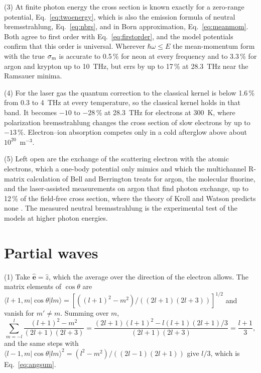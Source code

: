 \documentclass[11pt]{article}
\numberwithin{equation}{section}
\newcommand{\ehat}{\hat{\mathbf e}}
\newcommand{\sm}{\sigma_{\rm m}}
\begin{document}
{\noindent}(3) At finite photon energy the cross section is known exactly for
a zero-range potential, Eq.~\eqref{eq:twoenergy}, which is also the emission
formula of neutral bremsstrahlung, Eq.~\eqref{eq:nbrs}, and in Born
approximation, Eq.~\eqref{eq:meanmom}. Both agree to first order with
Eq.~\eqref{eq:firstorder}, and the model potentials confirm that this order is
universal. Wherever $\hbar\omega\le E$ the mean-momentum form with the true
$\sm$ is accurate to 0.5\,\% for neon at every frequency and to 3.3\,\% for
argon and krypton up to 10~THz, but errs by up to 17\,\% at 28.3~THz near the
Ramsauer minima.

{\noindent}(4) For the laser gas the quantum correction to the classical
kernel is below 1.6\,\% from 0.3 to 4~THz at every temperature, so the
classical kernel holds in that band. It becomes $-10$ to $-28$\,\% at 28.3~THz for electrons at 300~K, where
polarization bremsstrahlung changes the cross section of slow electrons by up
to $-13$\,\%. Electron--ion absorption competes only in a cold afterglow above
about $10^{20}$~m$^{-3}$.

{\noindent}(5) Left open are the exchange of the scattering electron with the
atomic electrons, which a one-body potential only mimics and which the
multichannel R-matrix calculation of Bell and Berrington
\cite{BellBerrington1987} treats for argon, the molecular fluorine, and the
laser-assisted measurements on argon that find photon exchange, up to 12\,\%
of the field-free cross section, where the theory of Kroll and Watson predicts
none \cite{WallbankHolmes1993,WallbankHolmes1994}. The
measured neutral bremsstrahlung \cite{TaylorCaledonia1969,Ranson1977} is the
experimental test of the models at higher photon energies.

\appendix
\section{Partial waves}
\label{app:angular}

{\noindent}(1) Take $\ehat=\hat z$, which the average over the direction of
the electron allows. The matrix elements of $\cos\theta$ are
$\langle l+1,m|\cos\theta|lm\rangle=[((l+1)^2-m^2)/((2l+1)(2l+3))]^{1/2}$ and
vanish for $m'\ne m$. Summing over $m$,
\begin{equation}
\sum_{m=-l}^l\frac{(l+1)^2-m^2}{(2l+1)(2l+3)}
=\frac{(2l+1)(l+1)^2-l(l+1)(2l+1)/3}{(2l+1)(2l+3)}=\frac{l+1}{3},
\end{equation}
and the same steps with $\langle l-1,m|\cos\theta|lm\rangle^2=(l^2-m^2)/((2l-1)(2l+1))$
give $l/3$, which is Eq.~\eqref{eq:angsum}.
\end{document}
